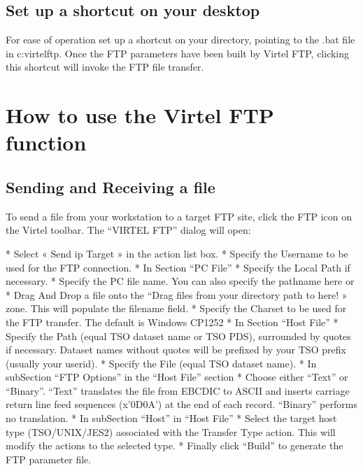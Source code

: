 \documentclass[letterpaper,10pt,english]{sphinxmanual}
\begin{document}
\subsection{Set up a shortcut on your desktop}
\label{\detokenize{Customization:set-up-a-shortcut-on-your-desktop}}
For ease of operation set up a shortcut on your directory, pointing to the .bat file in c:virtelftp. Once the FTP parameters have been built by Virtel FTP, clicking this shortcut will invoke the FTP file transfer.


\section{How to use the Virtel FTP function}
\label{\detokenize{Customization:how-to-use-the-virtel-ftp-function}}

\subsection{Sending and Receiving a file}
\label{\detokenize{Customization:sending-and-receiving-a-file}}
To send a file from your workstation to a target FTP site, click the FTP icon on the Virtel toolbar. The “VIRTEL FTP” dialog will open:



\begin{sphinxVerbatim}[commandchars=\\\{\}]
*   Select « Send ip Target » in the action list box.
*   Specify the Username to be used for the FTP connection.
*   In Section “PC File”
*   Specify the Local Path if necessary.
*   Specify the PC file name. You can also specify the pathname here or \PYGZhy{}
*   Drag And Drop a file onto the “Drag files from your directory path to here! » zone. This will populate the filename field.
*   Specify the Charset to be used for the FTP transfer. The default is Windows CP\PYGZhy{}1252
*   In Section “Host File”
*   Specify the Path (equal TSO dataset name or TSO PDS), surrounded by quotes if necessary. Dataset names without quotes will be prefixed by your TSO prefix (usually your userid).
*   Specify the File (equal TSO dataset name).
*   In sub\PYGZhy{}Section “FTP Options” in the “Host File” section
*   Choose either “Text” or “Binary”. “Text” translates the file from EBCDIC to ASCII and inserts carriage return line feed sequences (x’0D0A’) at the end of each record. “Binary” performs no translation.
*   In sub\PYGZhy{}Section “Host” in “Host File”
*   Select the target host type (TSO/UNIX/JES2) associated with the \PYGZdq{}Transfer Type\PYGZdq{} action. This will modify the actions to the selected type.
*   Finally click “Build” to generate the FTP parameter file.
\end{sphinxVerbatim}
\end{document}
